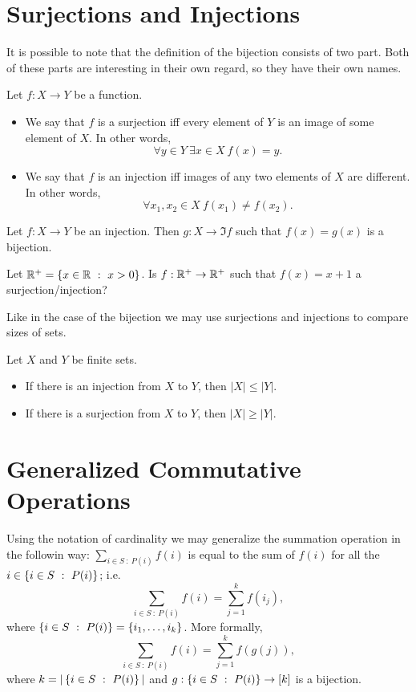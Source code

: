 \section{Surjections and Injections}

It is possible to note that the definition of the bijection consists of two part.
Both of these parts are interesting in their own regard, so they have their own
names.
\begin{definition}
  Let $f : X \to Y$ be a function.
  \begin{itemize}
    \item We say that $f$ is a surjection iff every element of $Y$ is an image
      of some element of $X$. In other words,
      \[
          \forall y \in Y~\exists x \in X\ f(x) = y.
      \]
    \item We say that $f$ is an injection iff images of any two elements
      of $X$ are different. In other words,
      \[
          \forall x_1, x_2 \in X\ f(x_1) \neq f(x_2).
      \]
  \end{itemize}
\end{definition}

\begin{remark}
  Let $f : X \to Y$ be an injection. Then $g : X \to \Im f$ such that
  $f(x) = g(x)$ is a bijection.
\end{remark}

\begin{exercise}
  Let $\R^+ = \set[x > 0]{x \in \R}$. Is $f : \mathbb{R}^+ \to \mathbb{R}^+$ such that
  $f(x) = x + 1$ a surjection/injection?
\end{exercise}

Like in the case of the bijection we may use surjections and injections to
compare sizes of sets.
\begin{theorem}
\label{theorem:injections-surjections-inequalities}
  Let $X$ and $Y$ be finite sets.
  \begin{itemize}
    \item If there is an injection from $X$ to $Y$, then $|X| \le |Y|$.
    \item If there is a surjection from $X$ to $Y$, then $|X| \ge |Y|$.
  \end{itemize}
\end{theorem}

\section{Generalized Commutative Operations}
Using the notation of cardinality we may generalize the summation operation in
the followin way: $\sum_{i \in S ~:~ P(i)} f(i)$ is equal to the sum of
$f(i)$ for all the $i \in \set[P(i)]{i \in S}$; i.e.
\[
  \sum_{i \in S ~:~ P(i)} f(i) = \sum_{j = 1}^k f(i_j),
\] where $\set[P(i)]{i \in S} = \set{i_1, \dots, i_k}$. More formally,
\[
  \sum_{i \in S ~:~ P(i)} f(i) = \sum_{j = 1}^k f(g(j)),
\]
where $k = |\set[P(i)]{i \in S}|$ and $g : \set[P(i)]{i \in S} \to [k]$ is a
bijection.

